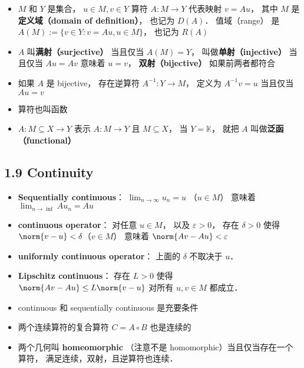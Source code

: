 \begin{itemize}
\item $M$ 和 $Y$ 是集合， $u \in M, v \in Y$ 算符 $A: M \to Y$ 代表映射 $v = Au$， 其中 $M$ 是\textbf{定义域（domain of definition）}， 也记为 $D(A)$． 值域（range） 是 $A(M) := \{v \in Y: v = Au, u \in M\}$， 也记为 $R(A)$

\item $A$ 叫\textbf{满射（surjective）} 当且仅当 $A(M) = Y$， 叫做\textbf{单射（injective）} 当且仅当 $Au = Av$ 意味着 $u = v$， \textbf{双射（bijective）} 如果前两者都符合

\item 如果 $A$ 是 bijective， 存在逆算符 $A^{-1}: Y \to M$， 定义为 $A^{-1} v = u$ 当且仅当 $Au = v$


\item 算符也叫函数

\item $A: M \subseteq X \to Y$ 表示 $A: M \to Y$ 且 $M \subseteq X$， 当 $Y = \mathbb K$， 就把 $A$ 叫做\textbf{泛函（functional）}
\end{itemize}

\subsection{1.9 Continuity}
\begin{itemize}
\item \textbf{Sequentially continuous}： $\lim_{n\to\infty} u_n = u$ （$u\in M$） 意味着 $\lim_{n\to\inf} Au_n = Au$

\item \textbf{continuous operator}： 对任意 $u\in M$， 以及 $\varepsilon>0$， 存在 $\delta >0$ 使得 $\norm{v-u}<\delta$（$v\in M$） 意味着 $\norm{Av-Au}<\varepsilon$

\item \textbf{uniformly continuous operator}： 上面的 $\delta$ 不取决于 $u$．

\item \textbf{Lipschitz continuous}： 存在 $L > 0$ 使得 $\norm{Av-Au} \le L\norm{v-u}$ 对所有 $u,v \in M$ 都成立．

\item continuous 和 sequentially continuous 是充要条件

\item 两个连续算符的复合算符 $C =  A \circ B$ 也是连续的

\item 两个几何叫 \textbf{homeomorphic} （注意不是 homomorphic）当且仅当存在一个算符， 满足连续，双射，且逆算符也连续．
\end{itemize}


